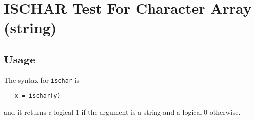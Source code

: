 \section{ISCHAR Test For Character Array (string)}

\subsection{Usage}

The syntax for \verb|ischar| is 
\begin{verbatim}
   x = ischar(y)
\end{verbatim}
and it returns a logical 1 if the argument is a string
and a logical 0 otherwise.
